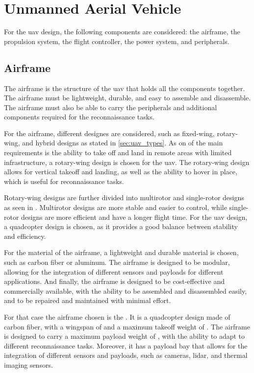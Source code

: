 \section{Unmanned Aerial Vehicle}\label{sec:design_uav}

For the \gls{uav} design, the following components are considered: the airframe, the propulsion system, the flight controller, the power system, and peripherals.

\subsection{Airframe}

The airframe is the structure of the \gls{uav} that holds all the components together. The airframe must be lightweight, durable, and easy to assemble and disassemble. The airframe must also be able to carry the peripherals and additional components required for the reconnaissance tasks.

For the airframe, different designes are considered, such as fixed-wing, rotary-wing, and hybrid designs as stated in \cref{sec:uav_types}. As on of the main requirements is the ability to take off and land in remote areas with limited infrastructure, a rotary-wing design is chosen for the \gls{uav}. The rotary-wing design allows for vertical takeoff and landing, as well as the ability to hover in place, which is useful for reconnaissance tasks.

Rotary-wing designs are further divided into multirotor and single-rotor designs as seen in . Multirotor designs are more stable and easier to control, while single-rotor designs are more efficient and have a longer flight time. For the \gls{uav} design, a quadcopter design is chosen, as it provides a good balance between stability and efficiency.


For the material of the airframe, a lightweight and durable material is chosen, such as carbon fiber or aluminum. The airframe is designed to be modular, allowing for the integration of different sensors and payloads for different applications. And finally, the airframe is designed to be cost-effective and commercially available, with the ability to be assembled and disassembled easily, and to be repaired and maintained with minimal effort.

For that case the airframe chosen  is the . It is a quadcopter design made of carbon fiber, with a wingspan of  and a maximum takeoff weight of . The airframe is designed to carry a maximum payload weight of , with the ability to adapt to different reconnaissance tasks. Moreover, it has a payload bay that allows for the integration of different sensors and payloads, such as cameras, lidar, and thermal imaging sensors.

